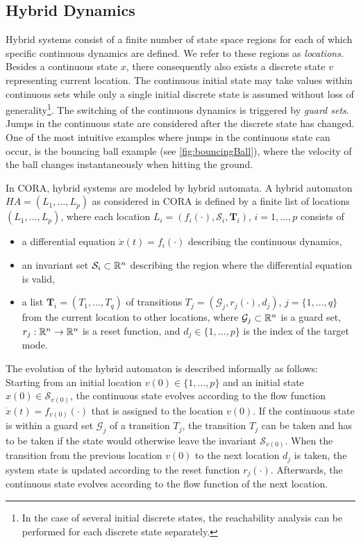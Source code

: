 
\subsection{Hybrid Dynamics} \label{sec:hybridDynamics}

Hybrid systems consist of a finite number of state space regions for each of which specific continuous dynamics are defined. We refer to these regions as \textit{locations}. Besides a continuous state $x$, there consequently also exists a discrete state $v$ representing current location. The continuous initial state may take values within continuous sets while only a single initial discrete state is assumed without loss of generality\footnote{In the case of several initial discrete states, the reachability analysis can be performed for each discrete state separately.}. The switching of the continuous dynamics is triggered by \textit{guard sets}. Jumps in the continuous state are considered after the discrete state has changed. One of the most intuitive examples where jumps in the continuous state can occur, is the bouncing ball example (see \cref{fig:bouncingBall}), where the velocity of the ball changes instantaneously when hitting the ground.

\vspace{0.2cm}

In CORA, hybrid systems are modeled by hybrid automata. A hybrid automaton $HA = (L_1,\dots,L_p)$ as considered in CORA is defined by a finite list of locations $(L_1,\dots,L_p)$, where each location $L_i = (f_i(\cdot),\mathcal{S}_i,\mathbf{T}_i)$, $i = 1,\dots,p$ consists of
\begin{itemize}
    \item a differential equation $\dot{x}(t) = f_i(\cdot)$ describing the continuous dynamics,
    \item an invariant set $\mathcal{S}_i \subset \mathbb{R}^n$ describing the region where the differential equation is valid,
    \item a list $\mathbf{T}_i = ( T_1,\dots, T_q)$ of transitions $T_j = ( \mathcal{G}_j,r_j(\cdot),d_j )$, $j = \{1,\dots,q\}$ from the current location to other locations, where $\mathcal{G}_j \subset \mathbb{R}^n$ is a guard set, $r_j: \mathbb{R}^n \to \mathbb{R}^n$ is a reset function, and $d_j \in \{1,\dots,p\}$ is the index of the target mode.
\end{itemize}

\vspace{0.2cm}

The evolution of the hybrid automaton is described informally as follows: Starting from an initial location $v(0) \in \{1,\dots,p\}$ and an initial state $x(0)\in \mathcal{S}_{v(0)}$, the continuous state evolves according to the flow function $\dot{x}(t) = f_{v(0)}(\cdot)$ that is assigned to the location $v(0)$. If the continuous state is within a guard set $\mathcal{G}_j$ of a transition $T_j$, the transition $T_j$ can be taken and has to be taken if the state would otherwise leave the invariant $\mathcal{S}_{v(0)}$. When the transition from the previous location $v(0)$ to the next location $d_j$ is taken, the system state is updated according to the reset function $r_j(\cdot)$. Afterwards, the continuous state evolves according to the flow function of the next location.

